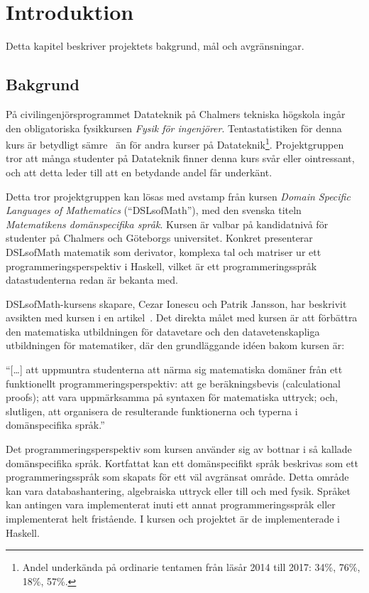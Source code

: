 
\chapter{Introduktion}

Detta kapitel beskriver projektets bakgrund, mål och avgränsningar.

\section{Bakgrund}

På civilingenjörsprogrammet Datateknik på Chalmers tekniska högskola ingår den obligatoriska
fysikkursen \textit{Fysik för ingenjörer}. Tentastatistiken för denna kurs är
betydligt sämre~\cite{tentastatistik} än för andra kurser på Datateknik\footnote{Andel underkända på
ordinarie tentamen från läsår 2014 till 2017: 34\%, 76\%, 18\%, 57\%.
}. Projektgruppen tror att många studenter på Datateknik finner denna
kurs svår eller ointressant, och att detta leder till att en betydande andel får
underkänt.

Detta tror projektgruppen kan lösas med avstamp från kursen \textit{Domain
Specific Languages of Mathematics} (``DSLsofMath''), med den svenska titeln
\textit{Matematikens domänspecifika språk}. Kursen är valbar på kandidatnivå för studenter på Chalmers och Göteborgs universitet. Konkret
presenterar DSLsofMath matematik som derivator, komplexa tal och
matriser ur ett programmeringsperspektiv i Haskell, vilket är ett programmeringsspråk datastudenterna redan är bekanta med.

DSLsofMath-kursens skapare, Cezar Ionescu och Patrik Jansson, har beskrivit avsikten med kursen i en artikel~\cite{tfpie2015}. Det direkta målet med kursen är
att förbättra den matematiska utbildningen för datavetare och den
datavetenskapliga utbildningen för matematiker, där den grundläggande idéen
bakom kursen är:

\begin{center} ``[\dots] att uppmuntra studenterna att närma sig matematiska
  domäner från ett funktionellt programmeringsperspektiv: att ge beräkningsbevis
  (calculational proofs); att vara uppmärksamma på syntaxen för matematiska
  uttryck; och, slutligen, att organisera de resulterande funktionerna och
typerna i domänspecifika språk.''~\cite{tfpie2015}~\cite{lecture-notes}\
\end{center}

Det programmeringsperspektiv som kursen använder sig av bottnar i
så kallade domänspecifika språk. Kortfattat kan ett domänspecifikt språk
beskrivas som ett programmeringsspråk som skapats för ett väl avgränsat
område. Detta område kan vara databashantering, algebraiska uttryck eller till
och med fysik. Språket kan antingen vara implementerat inuti ett annat
programmeringsspråk eller implementerat helt fristående. I kursen och projektet
är de implementerade i Haskell.

